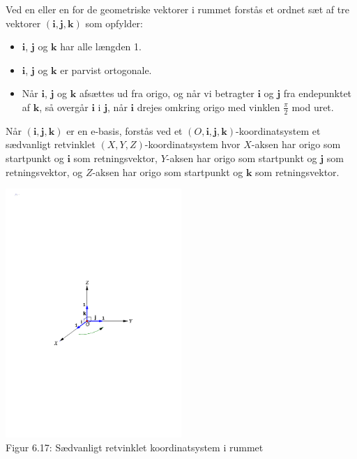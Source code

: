 \begin{definition}
Ved en  eller en  for de geometriske vektorer i rummet forstås et ordnet sæt af tre vektorer $(\mathbf i,\mathbf j,\mathbf k)$ som opfylder:
\begin{itemize}
\item
$\mathbf i$, $\mathbf j$ og $\mathbf k$ har alle længden 1.
\item
$\mathbf i$, $\mathbf j$ og $\mathbf k$ er parvist ortogonale.
\item
Når $\mathbf i$, $\mathbf j$ og $\mathbf k$ afsættes ud fra origo, og når vi betragter $\mathbf i$ og $\mathbf j$ fra endepunktet af $\mathbf k$, så
overgår $\mathbf i$ i $\mathbf j$, når $\mathbf i$ drejes omkring origo med vinklen $\frac \pi 2$ mod uret.
\end{itemize}
Når $(\mathbf i,\mathbf j,\mathbf k)$ er en e-basis, forstås ved et $(O,\mathbf i,\mathbf j,\mathbf k)$-koordinatsystem et sædvanligt retvinklet $(X,Y,Z)$-koordinatsystem hvor $X$-aksen har origo som startpunkt og $\mathbf i$ som retningsvektor, $Y$-aksen har origo som startpunkt og $\mathbf j$ som retningsvektor, og $Z$-aksen har origo som startpunkt og $\mathbf k$ som retningsvektor.
\begin{center}
		\includegraphics[trim=4cm 10.5cm 4cm 10.5cm,width=0.5\textwidth,clip]{geometer/vektor11.pdf}				
		\\Figur 6.17: Sædvanligt retvinklet koordinatsystem i rummet
\end{center}
\end{definition}

